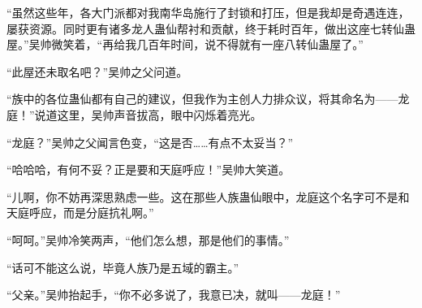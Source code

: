 \begin{this_body}
“虽然这些年，各大门派都对我南华岛施行了封锁和打压，但是我却是奇遇连连，屡获资源。同时更有诸多龙人蛊仙帮衬和贡献，终于耗时百年，做出这座七转仙蛊屋。”吴帅微笑着，“再给我几百年时间，说不得就有一座八转仙蛊屋了。”

“此屋还未取名吧？”吴帅之父问道。

“族中的各位蛊仙都有自己的建议，但我作为主创人力排众议，将其命名为——龙庭！”说道这里，吴帅声音拔高，眼中闪烁着亮光。

“龙庭？”吴帅之父闻言色变，“这是否……有点不太妥当？”

“哈哈哈，有何不妥？正是要和天庭呼应！”吴帅大笑道。

“儿啊，你不妨再深思熟虑一些。这在那些人族蛊仙眼中，龙庭这个名字可不是和天庭呼应，而是分庭抗礼啊。”

“呵呵。”吴帅冷笑两声，“他们怎么想，那是他们的事情。”

“话可不能这么说，毕竟人族乃是五域的霸主。”

“父亲。”吴帅抬起手，“你不必多说了，我意已决，就叫——龙庭！”

\end{this_body}

